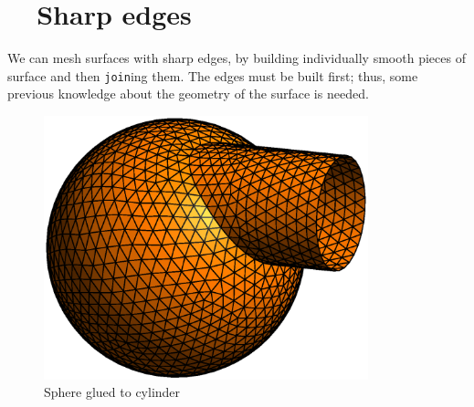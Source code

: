 \section{~~Sharp edges}\label{\numb section 3.\numb parag 18}

We can mesh surfaces with sharp edges, by building individually smooth pieces of surface
and then {\small\tt join}ing them.
The edges must be built first;
thus, some previous knowledge about the geometry of the surface is needed.

\begin{figure} \centering
 \includegraphics[width=94mm]{sphere-cyl}
  \caption{Sphere glued to cylinder}
  \label{\numb section 3.\numb fig 5}
\end{figure}


